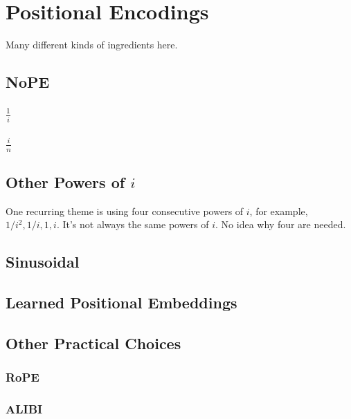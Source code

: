 %
\chapter{Positional Encodings}
%

Many different kinds of ingredients here.



\section{NoPE}

\subsection{$\frac{1}{i}$}


\subsection{$\frac{i}{n}$}

\section{Other Powers of $i$}

One recurring theme is using four consecutive powers of $i$, for example, $1/i^2, 1/i, 1, i$. It's not always the same powers of $i$. No idea why four are needed.

\section{Sinusoidal}


\section{Learned Positional Embeddings}


\section{Other Practical Choices}

\subsection{RoPE}

\subsection{ALIBI}